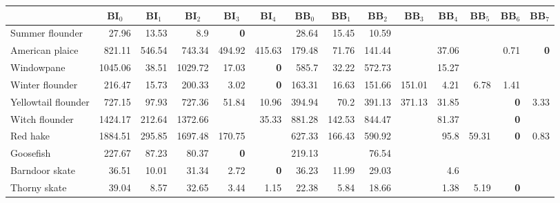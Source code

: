 \begin{center}
\begin{tabular}{lrrrrrrrrrrrrr}
\hline\hline
\multicolumn{1}{l}{}&\multicolumn{1}{c}{BI$_{0}$}&\multicolumn{1}{c}{BI$_{1}$}&\multicolumn{1}{c}{BI$_{2}$}&\multicolumn{1}{c}{BI$_{3}$}&\multicolumn{1}{c}{BI$_{4}$}&\multicolumn{1}{c}{BB$_{0}$}&\multicolumn{1}{c}{BB$_{1}$}&\multicolumn{1}{c}{BB$_{2}$}&\multicolumn{1}{c}{BB$_{3}$}&\multicolumn{1}{c}{BB$_{4}$}&\multicolumn{1}{c}{BB$_{5}$}&\multicolumn{1}{c}{BB$_{6}$}&\multicolumn{1}{c}{BB$_{7}$}\tabularnewline
\hline
   Summer flounder&   27.96&   13.53&   8.9&\bfseries   0&   &   28.64&   15.45&   10.59&   &   &   &   &   \tabularnewline
   American plaice&   821.11&   546.54&   743.34&   494.92&   415.63&   179.48&   71.76&   141.44&   &   37.06&   &   0.71&\bfseries   0\tabularnewline
   Windowpane&   1045.06&   38.51&   1029.72&   17.03&\bfseries   0&   585.7&   32.22&   572.73&   &   15.27&   &   &   \tabularnewline
   Winter flounder&   216.47&   15.73&   200.33&   3.02&\bfseries   0&   163.31&   16.63&   151.66&   151.01&   4.21&   6.78&   1.41&   \tabularnewline
   Yellowtail flounder&   727.15&   97.93&   727.36&   51.84&   10.96&   394.94&   70.2&   391.13&   371.13&   31.85&   &\bfseries   0&   3.33\tabularnewline
   Witch flounder&   1424.17&   212.64&   1372.66&   &   35.33&   881.28&   142.53&   844.47&   &   81.37&   &\bfseries   0&   \tabularnewline
   Red hake&   1884.51&   295.85&   1697.48&   170.75&   &   627.33&   166.43&   590.92&   &   95.8&   59.31&\bfseries   0&   0.83\tabularnewline
   Goosefish&   227.67&   87.23&   80.37&\bfseries   0&   &   219.13&   &   76.54&   &   &   &   &   \tabularnewline
   Barndoor skate&   36.51&   10.01&   31.34&   2.72&\bfseries   0&   36.23&   11.99&   29.03&   &   4.6&   &   &   \tabularnewline
   Thorny skate&   39.04&   8.57&   32.65&   3.44&   1.15&   22.38&   5.84&   18.66&   &   1.38&   5.19&\bfseries   0&   \tabularnewline
\hline
\end{tabular}\end{center}

